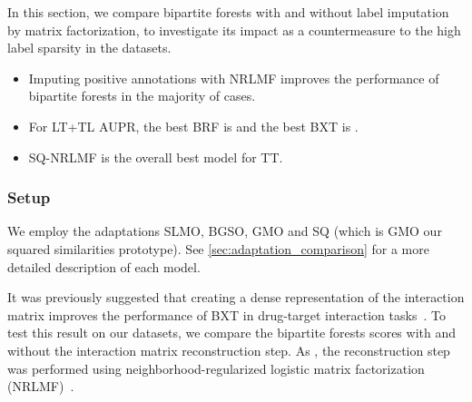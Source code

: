 In this section, we compare bipartite forests with and without label imputation by matrix factorization, to investigate its impact as a countermeasure to the high label sparsity in the datasets.

\begin{mdframed}[frametitle={Key findings}]
    \begin{itemize}
        \item Imputing positive annotations with NRLMF improves the performance of bipartite forests in the majority of cases.
        \item For LT+TL AUPR, the best BRF is  and the best BXT is .
        \item SQ-NRLMF is the overall best model for TT.
    \end{itemize}
\end{mdframed}

\subsubsection{Setup}

We employ the adaptations SLMO, BGSO, GMO and SQ (which is GMO our squared similarities prototype). See \autoref{sec:adaptation_comparison} for a more detailed description of each model.

It was previously suggested that creating a dense representation of the interaction matrix improves the performance of BXT in drug-target interaction tasks~\cite{pliakos2020drugtarget}.
To test this result on our datasets, we compare the bipartite forests scores with and without the interaction matrix reconstruction step. As \cite{pliakos2020drugtarget}, the reconstruction step was performed using neighborhood-regularized logistic matrix factorization (NRLMF)~\cite{liu2016neighborhood}.

